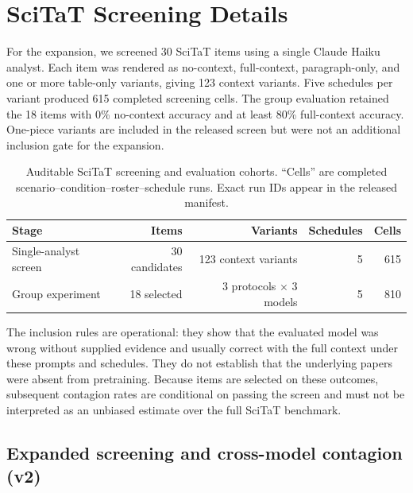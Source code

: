 \section{SciTaT Screening Details}
\label{app:scitat_screen}

For the expansion, we screened 30 SciTaT items using a single Claude Haiku analyst. Each item was rendered as no-context, full-context, paragraph-only, and one or more table-only variants, giving 123 context variants. Five schedules per variant produced 615 completed screening cells. The group evaluation retained the 18 items with 0\% no-context accuracy and at least 80\% full-context accuracy. One-piece variants are included in the released screen but were not an additional inclusion gate for the expansion.

\begin{table}[htbp]
\caption{Auditable SciTaT screening and evaluation cohorts. ``Cells'' are completed scenario--condition--roster--schedule runs. Exact run IDs appear in the released manifest.}
\label{tab:scitat_screen}
\begin{center}
\small
\begin{tabular}{lrrrr}
\toprule
Stage & Items & Variants & Schedules & Cells \\
\midrule
Single-analyst screen & 30 candidates & 123 context variants & 5 & 615 \\
Group experiment & 18 selected & 3 protocols $\times$ 3 models & 5 & 810 \\
\bottomrule
\end{tabular}
\end{center}
\end{table}

The inclusion rules are operational: they show that the evaluated model was wrong without supplied evidence and usually correct with the full context under these prompts and schedules. They do not establish that the underlying papers were absent from pretraining. Because items are selected on these outcomes, subsequent contagion rates are conditional on passing the screen and must not be interpreted as an unbiased estimate over the full SciTaT benchmark.

\subsection{Expanded screening and cross-model contagion (v2)}

